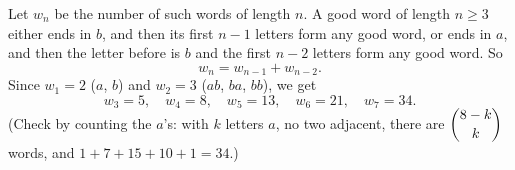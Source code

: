 Let $w_n$ be the number of such words of length $n$. A good word of length $n\ge3$ either ends in $b$, and then its first $n-1$ letters form any good word, or ends in $a$, and then the letter before is $b$ and the first $n-2$ letters form any good word. So
\[w_n=w_{n-1}+w_{n-2}.\]
Since $w_1=2$ ($a$, $b$) and $w_2=3$ ($ab$, $ba$, $bb$), we get
\[w_3=5,\quad w_4=8,\quad w_5=13,\quad w_6=21,\quad w_7=\boxed{34}.\]
(Check by counting the $a$'s: with $k$ letters $a$, no two adjacent, there are $\dbinom{8-k}{k}$ words, and $1+7+15+10+1=34$.)
